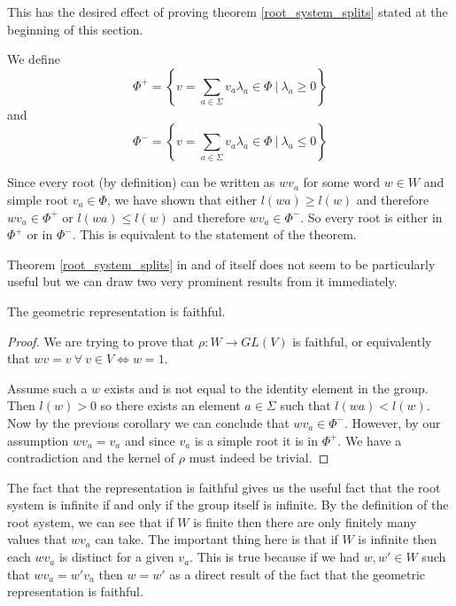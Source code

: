 \documentclass[a4paper,12pt]{article}
\begin{document}
This has the desired effect of proving theorem \ref{root_system_splits} stated at the beginning of this section. 

\begin{definition}
	We define 
	\[\Phi^+ = \left\{v = \sum_{a \in \Sigma} v_a\lambda_a \in \Phi \: | \: \lambda_a \geq 0 \right\}\] and 
	\[\Phi^- = \left\{v = \sum_{a \in \Sigma} v_a\lambda_a \in \Phi \: | \: \lambda_a \leq 0 \right\}\]
\end{definition}

Since every root (by definition) can be written as $wv_a$ for some word $w \in W$ and simple root $v_a \in \Phi$, we have shown that either $l(wa) \geq l(w)$ and therefore $wv_a \in \Phi^+$ or $l(wa) \leq l(w)$ and therefore $wv_a \in \Phi^-$. So every root is either in $\Phi^+$ or in $\Phi^-$. This is equivalent to the statement of the theorem.

Theorem \ref{root_system_splits} in and of itself does not seem to be particularly useful but we can draw two very prominent results from it immediately.

\begin{cor}
	The geometric representation is faithful.
\end{cor}

\begin{proof}
	We are trying to prove that $\rho: W \rightarrow GL(V)$ is faithful, or equivalently that $wv = v \: \forall \: v \in V \Leftrightarrow w = 1$.
	
	Assume such a $w$ exists and is not equal to the identity element in the group. Then $l(w) > 0$ so there exists an element $a \in \Sigma$ such that $l(wa) < l(w)$. Now by the previous corollary we can conclude that $wv_a \in \Phi^-$. However, by our assumption $wv_a = v_a$ and since $v_a$ is a simple root it is in $\Phi^+$. We have a contradiction and the kernel of $\rho$ must indeed be trivial.
\end{proof}

The fact that the representation is faithful gives us the useful fact that the root system is infinite if and only if the group itself is infinite. By the definition of the root system, we can see that if $W$ is finite then there are only finitely many values that $wv_a$ can take. The important thing here is that if $W$ is infinite then each $wv_a$ is distinct for a given $v_a$. This is true because if we had $w, w' \in W$ such that $wv_a = w'v_a$ then $w = w'$ as a direct result of the fact that the geometric representation is faithful.
\end{document}

